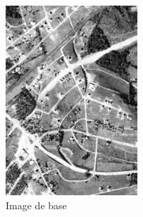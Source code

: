 \documentclass{article}
\begin{document}
\begin{figure}[h!]
    \centering
    \begin{minipage}{0.24\textwidth}
        \centering
        \includegraphics[width=\linewidth]{result_image/Image_2/1.jpg}
        \caption*{\small Image de base}
    \end{minipage}\hfill
    \begin{minipage}{0.24\textwidth}
        \centering

\end{minipage}
\end{figure}
\end{document}
